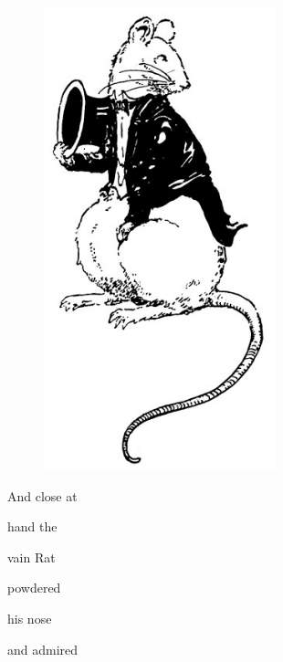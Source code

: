 \documentclass[letterpaper, 10pt, openany]{memoir}
\begin{document}
\newpage
\begin{figure}
	\includegraphics[width=0.6\textwidth]{image_008.jpg}
\end{figure}

And close at

\vspace{\onelineskip}

hand the

\vspace{\onelineskip}

vain Rat

\vspace{\onelineskip}

powdered

\vspace{\onelineskip}

his nose

\vspace{\onelineskip}

and admired

\vspace{\onelineskip}
\end{document}
